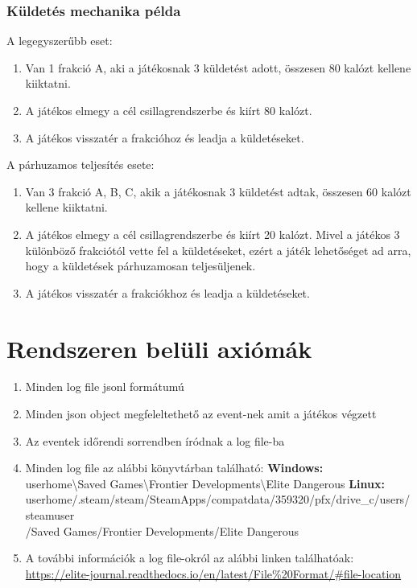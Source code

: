 \documentclass{scrreprt}
\begin{document}
    \subsection{Küldetés mechanika példa}\label{subsec:kuldetes-mechanika-pelda}
    A legegyszerűbb eset:
    \begin{enumerate}[label=\thechapter.\arabic*.]
        \item Van 1 frakció A, aki a játékosnak 3 küldetést adott, összesen 80 kalózt kellene kiiktatni.
        \item A játékos elmegy a cél csillagrendszerbe és kiírt 80 kalózt.
        \item A játékos visszatér a frakcióhoz és leadja a küldetéseket.
    \end{enumerate}
    A párhuzamos teljesítés esete:
    \begin{enumerate}[label=\thechapter.\arabic*.]
        \item Van 3 frakció A, B, C, akik a játékosnak 3 küldetést adtak, összesen 60 kalózt kellene kiiktatni.
        \item A játékos elmegy a cél csillagrendszerbe és kiírt 20 kalózt.
        Mivel a játékos 3 különböző frakciótól vette fel a küldetéseket, ezért a játék lehetőséget ad arra, hogy a küldetések párhuzamosan teljesüljenek.
        \item A játékos visszatér a frakciókhoz és leadja a küldetéseket.
    \end{enumerate}

    \chapter{Rendszeren belüli axiómák}\label{ch:rendszeren-beluli-axiomak}
    \begin{enumerate}[label=\thechapter.\arabic*.]
        \item Minden log file jsonl formátumú
        \item Minden json object megfeleltethető az event-nek amit a játékos végzett
        \item Az eventek időrendi sorrendben íródnak a log file-ba
        \item Minden log file az alábbi könyvtárban található:
        \subitem \textbf{Windows:} \\
        userhome\textbackslash Saved Games\textbackslash Frontier Developments\textbackslash Elite Dangerous
        \subitem \textbf{Linux:}  \\
        userhome/.steam/steam/SteamApps/compatdata/359320/pfx/drive\_c/users/steamuser\\
        /Saved Games/Frontier Developments/Elite Dangerous
        \item A további információk a log file-okról az alábbi linken találhatóak: \\\url{https://elite-journal.readthedocs.io/en/latest/File\%20Format/#file-location}
    \end{enumerate}
\end{document}
